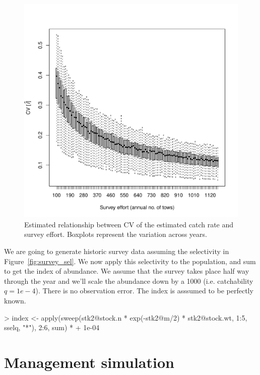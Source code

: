 \documentclass[a4paper]{article}
\begin{document}
\begin{figure}
\centering
\includegraphics{../dat/effCV.pdf}
\caption{Estimated relationship between CV of the estimated catch rate and survey effort. Boxplots represent the variation across years.}
\label{fig:effCV}
\end{figure} 


We are going to generate historic survey data assuming the selectivity in Figure~\ref{fig:survey_sel}.
We now apply this selectivity to the population, and sum to get the index of abundance.
We assume that the survey takes place half way through the year
and we'll scale the abundance down by a 1000 (i.e. catchability $q=1e-4$). There is no observation error. The index
is asssumed to be perfectly known.

\begin{Schunk}
\begin{Sinput}
> index <- apply(sweep(stk2@stock.n * exp(-stk2@m/2) * stk2@stock.wt, 1:5, sselq, "*"), 2:6, sum) * 
+     1e-04
\end{Sinput}
\end{Schunk}

\section{Management simulation}
\end{document}
